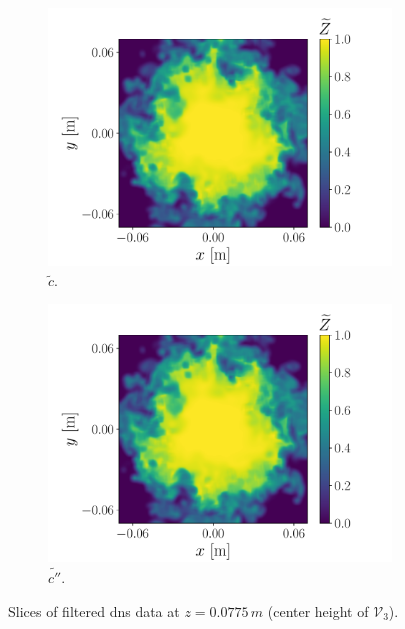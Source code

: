 \documentclass[review]{elsarticle}
\newcommand{\wt}[1]{\widetilde{#1}}
\begin{document}
\begin{figure}[!tbp]
\begin{subfigure}[t]{0.48\textwidth}
    \includegraphics[page=3,width=\textwidth, trim=0.4cm 0cm 1.4cm 0cm, clip=true]{./figs/dice_0004_slice.pdf}%
    \caption{$\wt{c}$.}%
 \end{subfigure}\hfill%
  \begin{subfigure}[t]{0.48\textwidth}%
    \includegraphics[page=4,width=\textwidth, trim=0.4cm 0cm 1.4cm 0cm, clip=true]{./figs/dice_0004_slice.pdf}%
    \caption{$\wt{c''}$.}%
  \end{subfigure}
  \caption{Slices of filtered \gls{dns} data at $z=0.0775\,\unit{m}$ (center height of $\mathcal{V}_3$).}\label{fig:slices}%
\end{figure}%
\end{document}
